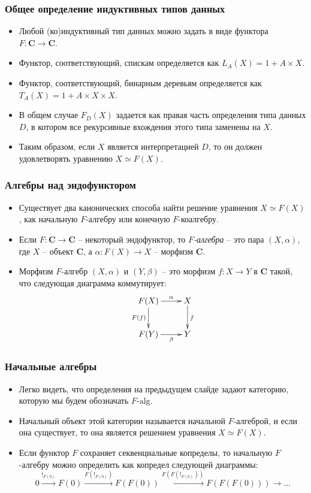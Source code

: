 \documentclass{beamer}
\theoremstyle{definition}
\newcommand{\cat}[1]{\mathbf{#1}}
\renewcommand{\C}{\cat{C}}
\begin{document}
\begin{frame}
\frametitle{Общее определение индуктивных типов данных}
\begin{itemize}
\item Любой (ко)индуктивный тип данных можно задать в виде функтора $F : \C \to \C$.
\item Функтор, соответствующий, спискам определяется как $L_A(X) = 1 + A \times X$.
\item Функтор, соответствующий, бинарным деревьям определяется как $T_A(X) = 1 + A \times X \times X$.
\item В общем случае $F_D(X)$ задается как правая часть определения типа данных $D$, в котором все рекурсивные вхождения этого типа заменены на $X$.
\item Таким образом, если $X$ является интерпретацией $D$, то он должен удовлетворять уравнению $X \simeq F(X)$.
\end{itemize}
\end{frame}

\begin{frame}
\frametitle{Алгебры над эндофунктором}
\begin{itemize}
\item Существует два канонических способа найти решение уравнения $X \simeq F(X)$, как начальную $F$-алгебру или конечную $F$-коалгебру.
\item Если $F : \C \to \C$ -- некоторый эндофунктор, то \emph{$F$-алгебра} -- это пара $(X,\alpha)$, где $X$ -- объект $\C$, а $\alpha : F(X) \to X$ -- морфизм $\C$.
\item Морфизм $F$-алгебр $(X,\alpha)$ и $(Y,\beta)$ -- это морфизм $f : X \to Y$ в $\C$ такой, что следующая диаграмма коммутирует:
\[ \xymatrix{ F(X) \ar[r]^-\alpha \ar[d]_{F(f)} & X \ar[d]^f \\
              F(Y) \ar[r]_-\beta                & Y
            } \]
\end{itemize}
\end{frame}

\begin{frame}
\frametitle{Начальные алгебры}
\begin{itemize}
\item Легко видеть, что определения на предыдущем слайде задают категорию, которую мы будем обозначать $F\text{-}\mathrm{alg}$.
\item Начальный объект этой категории называется начальной $F$-алгеброй, и если она существует, то она является решением уравнения $X \simeq F(X)$.
\item Если функтор $F$ сохраняет секвенциальные копределы, то начальную $F$-алгебру можно определить как копредел следующей диаграммы:
\[ 0 \xrightarrow{!_{F(0)}} F(0) \xrightarrow{F(!_{F(0)})} F(F(0)) \xrightarrow{F(F(!_{F(0)}))} F(F(F(0))) \to \ldots \]
\end{itemize}
\end{frame}
\end{document}
